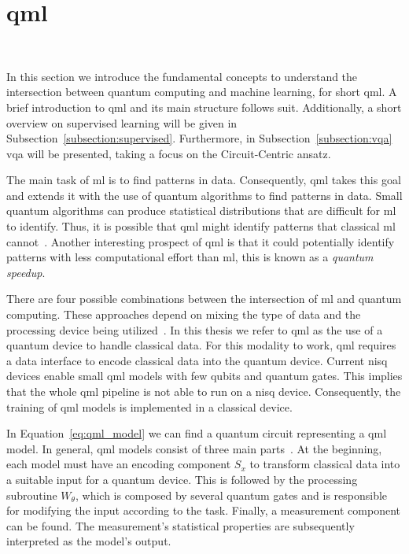 
\section{\acl{qml}}\label{section:qml} \

In this section we introduce the fundamental concepts to
understand the intersection between quantum computing and
machine learning, for short \ac{qml}. A brief introduction
to \ac{qml} and its main structure follows suit. Additionally,
a short overview on supervised learning will be given in
Subsection~\ref{subsection:supervised}. Furthermore,
in Subsection~\ref{subsection:vqa} \ac{vqa} will be presented,
taking a focus on the Circuit-Centric ansatz. \

The main task of \acf{ml} is to find patterns in data. Consequently,
\acf{qml} takes this goal and extends it with the use of quantum
algorithms to find patterns in data. Small quantum algorithms can produce
statistical distributions that are difficult for \ac{ml} to identify.
Thus, it is possible that \ac{qml} might identify patterns that
classical \ac{ml} cannot~\cite{biamonte_quantum_2017}. Another interesting
prospect of \ac{qml} is that it could potentially identify patterns with
less computational effort than \ac{ml}, this is known as a
\textit{quantum speedup}. \

There are four possible combinations between the intersection of
\ac{ml} and quantum computing. These approaches depend on mixing
the type of data and the processing device being utilized~\cite{schuld_machine_2021}.
In this thesis we refer to \ac{qml} as the use of a quantum device to
handle classical data. For this modality to work, \ac{qml} requires a data
interface to encode classical data into the quantum device. Current 
\ac{nisq} devices enable small \ac{qml} models with few qubits and
quantum gates. This implies that the whole \ac{qml} pipeline is not
able to run on a \ac{nisq} device. Consequently, the training of
\ac{qml} models is implemented in a classical device. \

In Equation~\ref{eq:qml_model} we can find a quantum circuit representing
a \ac{qml} model. In general, \ac{qml} models consist of three main parts~\cite{schuld_supervised_2021}.
At the beginning, each model must have an encoding component \(S_{x}\) to
transform classical data into a suitable input for a quantum device.
This is followed by the processing subroutine \(W_{\theta}\), which is composed
by several quantum gates and is responsible for modifying the input
according to the task. Finally, a measurement component can be found. The
measurement's statistical properties are subsequently interpreted as
the model's output. \

